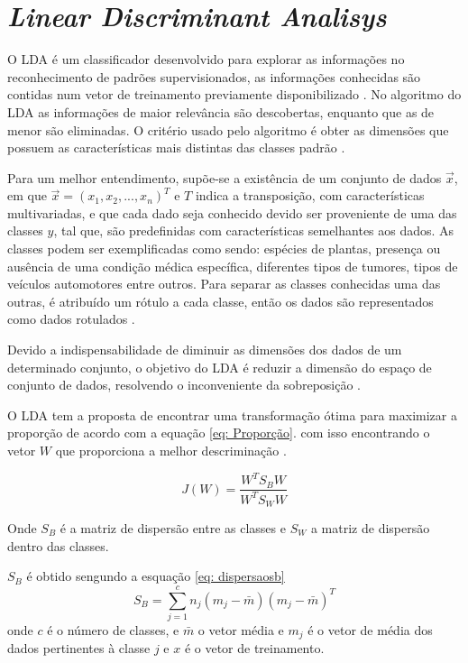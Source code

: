 \section{\textit{Linear Discriminant Analisys}}
O LDA é um classificador desenvolvido para explorar as informações no reconhecimento de padrões supervisionados,
as informações conhecidas são contidas num vetor de treinamento previamente disponibilizado \cite{izenmanLDA}.
No algoritmo do LDA as informações de maior relevância são descobertas, enquanto que as de menor são 
eliminadas. O critério usado pelo algoritmo é obter as dimensões que possuem as características mais
distintas das classes padrão \cite{korkmaz2017expert}.

Para um melhor entendimento, supõe-se a existência de um conjunto de dados $\vec x$, em que $\vec x = (x_1, x_2,...,x_n)^T$
e $T$ indica a transposição, com características multivariadas, e que cada dado
seja conhecido devido ser proveniente de uma das  classes $y$, tal que, são predefinidas com características
semelhantes aos dados. As classes podem ser exemplificadas como sendo: espécies de plantas,
presença ou ausência de uma condição médica específica, diferentes tipos de tumores, tipos de veículos automotores
entre outros. Para separar as classes conhecidas uma das outras, é atribuído um rótulo a cada classe, então os dados são
representados como dados rotulados \cite{izenmanLDA}.


Devido a indispensabilidade de diminuir as dimensões dos dados de um determinado conjunto, o objetivo do LDA
é reduzir a dimensão do espaço de conjunto de dados, resolvendo o inconveniente da sobreposição \cite{SinghLDA}.

O LDA tem a proposta de encontrar uma transformação ótima para maximizar a proporção de acordo com a equação \ref{eq: Proporção}.
com isso encontrando o vetor $W$ que proporciona a melhor descriminação \cite{ketsuwan2017linear}.

\begin{equation}
	\label{eq: Proporção}
	J(W) = \frac { W^T S_B W}{W^T S_W W}
\end{equation}

Onde $S_B$ é a matriz de dispersão entre as classes e $ S_W$ a matriz de dispersão dentro das classes. 

$S_B$ é obtido sengundo a esquação \ref{eq: dispersaosb} 
\begin{equation}
	\label{eq: dispersaosb}
	 S_B = \sum_{j=1}^{c} n_j(m_j - \bar m)(m_j -\bar m)^T 
\end{equation}
onde $c$ é o número de classes, e $\bar m$ o vetor média e  $m_j$ é o vetor de média dos dados 
pertinentes à classe $j$ e $x$ é o vetor de treinamento.

